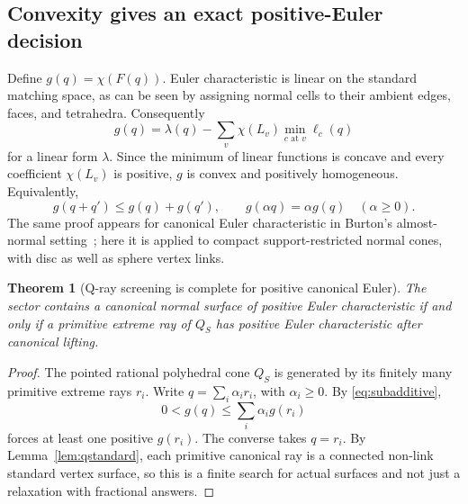 \documentclass[11pt]{article}
\newtheorem{theorem}{Theorem}[section]
\theoremstyle{definition}
\theoremstyle{remark}
\begin{document}
\subsection{Convexity gives an exact positive-Euler decision}

Define $g(q)=\chi(F(q))$. Euler characteristic is linear on the standard
matching space, as can be seen by assigning normal cells to their ambient
edges, faces, and tetrahedra. Consequently
\begin{equation}
 g(q)=\lambda(q)-\sum_v\chi(L_v)\min_{c\text{ at }v}\ell_c(q)
 \label{eq:eulerg}
\end{equation}
for a linear form $\lambda$. Since the minimum of linear functions is concave
and every coefficient $\chi(L_v)$ is positive, $g$ is convex and positively
homogeneous. Equivalently,
\begin{equation}
 g(q+q')\le g(q)+g(q'),\qquad g(\alpha q)=\alpha g(q)
 \quad(\alpha\ge0).
 \label{eq:subadditive}
\end{equation}
The same proof appears for canonical Euler characteristic in Burton's
almost-normal setting~\cite[proof of Theorem 5.5]{burton2010}; here it is
applied to compact support-restricted normal cones, with disc as well as sphere
vertex links.

\begin{theorem}[Q-ray screening is complete for positive canonical Euler]
\label{thm:qpositive}
The sector contains a canonical normal surface of positive Euler characteristic
if and only if a primitive extreme ray of $Q_S$ has positive Euler characteristic
after canonical lifting.
\end{theorem}
\begin{proof}
The pointed rational polyhedral cone $Q_S$ is generated by its finitely many
primitive extreme rays $r_i$. Write $q=\sum_i\alpha_i r_i$, with
$\alpha_i\ge0$. By \eqref{eq:subadditive},
\[
 0<g(q)\le\sum_i\alpha_i g(r_i)
\]
forces at least one positive $g(r_i)$. The converse takes $q=r_i$. By
Lemma~\ref{lem:qstandard}, each primitive canonical ray is a connected
non-link standard vertex surface, so this is a finite search for actual
surfaces and not just a relaxation with fractional answers.
\end{proof}
\end{document}
